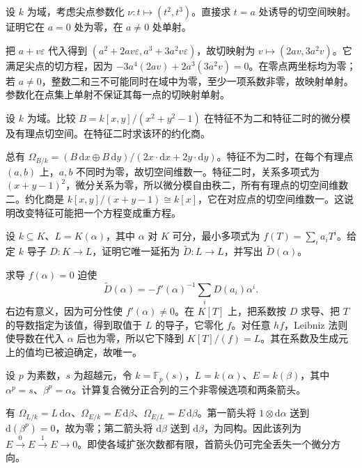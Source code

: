 \begin{exercise}\label{b3:ex:14-cusp-tangent-map}
	设 \(k\) 为域，考虑尖点参数化 \(\nu:t\mapsto(t^2,t^3)\)。直接求 \(t=a\) 处诱导的切空间映射。证明它在 \(a=0\) 处为零，在 \(a\ne0\) 处单射。
\end{exercise}
\begin{solution}
	把 \(a+v\varepsilon\) 代入得到 \((a^2+2av\varepsilon,a^3+3a^2v\varepsilon)\)，故切映射为 \(v\mapsto(2av,3a^2v)\)。它满足尖点的切方程，因为 \(-3a^4(2av)+2a^3(3a^2v)=0\)。在零点两坐标均为零；若 \(a\ne0\)，整数二和三不可能同时在域中为零，至少一项系数非零，故映射单射。参数化在点集上单射不保证其每一点的切映射单射。
\end{solution}

\begin{exercise}\label{b3:ex:14-characteristic-two-circle}
	设 \(k\) 为域。比较 \(B=k[x,y]/(x^2+y^2-1)\) 在特征不为二和特征二时的微分模及有理点切空间。在特征二时求该环的约化商。
\end{exercise}
\begin{solution}
	总有 \(\Omega_{B/k}=(B\,\mathrm{d}x\oplus B\,\mathrm{d}y)/(2x\cdot\mathrm{d}x+2y\cdot\mathrm{d}y)\)。特征不为二时，在每个有理点 \((a,b)\) 上，\(a,b\) 不同时为零，故切空间维数一。特征二时，关系多项式为 \((x+y-1)^2\)，微分关系为零，所以微分模自由秩二，所有有理点的切空间维数二。约化商是 \(k[x,y]/(x+y-1)\cong k[x]\)，它在对应点的切空间维数一。这说明改变特征可能把一个方程变成重方程。
\end{solution}

\begin{exercise}\label{b3:ex:14-separable-derivation-extension}
	设 \(k\subseteq K\)、\(L=K(\alpha)\)，其中 \(\alpha\) 对 \(K\) 可分，最小多项式为 \(f(T)=\sum_i a_iT^i\)。给定 \(k\) 导子 \(D:K\to L\)，证明它唯一延拓为 \(\widetilde D:L\to L\)，并写出 \(\widetilde D(\alpha)\)。
\end{exercise}
\begin{solution}
	求导 \(f(\alpha)=0\) 迫使
	\[
		\widetilde D(\alpha)=-f'(\alpha)^{-1}\sum_iD(a_i)\alpha^i.
	\]
	右边有意义，因为可分性使 \(f'(\alpha)\ne0\)。在 \(K[T]\) 上，把系数按 \(D\) 求导、把 \(T\) 的导数指定为该值，得到取值于 \(L\) 的导子，它零化 \(f\)。对任意 \(hf\)，Leibniz 法则使导数在代入 \(\alpha\) 后也为零，所以它下降到 \(K[T]/(f)=L\)。其在系数及生成元上的值均已被迫确定，故唯一。
\end{solution}

\begin{exercise}\label{b3:ex:14-purely-inseparable-tower}
	设 \(p\) 为素数，\(s\) 为超越元，令 \(k=\mathbb F_p(s)\)，\(L=k(\alpha)\)、\(E=k(\beta)\)，其中 \(\alpha^p=s\)、\(\beta^p=\alpha\)。计算复合微分正合列的三个非零候选项和两条箭头。
\end{exercise}
\begin{solution}
	有 \(\Omega_{L/k}=L\,\mathrm{d}\alpha\)、\(\Omega_{E/k}=E\,\mathrm{d}\beta\)、\(\Omega_{E/L}=E\,\mathrm{d}\beta\)。第一箭头将 \(1\otimes \mathrm{d}\alpha\) 送到 \(\mathrm{d}(\beta^p)=0\)，故为零；第二箭头将 \(\mathrm{d}\beta\) 送到 \(\mathrm{d}\beta\)，为同构。因此该列为 \(E\xrightarrow{0}E\xrightarrow{1}E\to0\)。即使各域扩张次数都有限，首箭头仍可完全丢失一个微分方向。
\end{solution}

